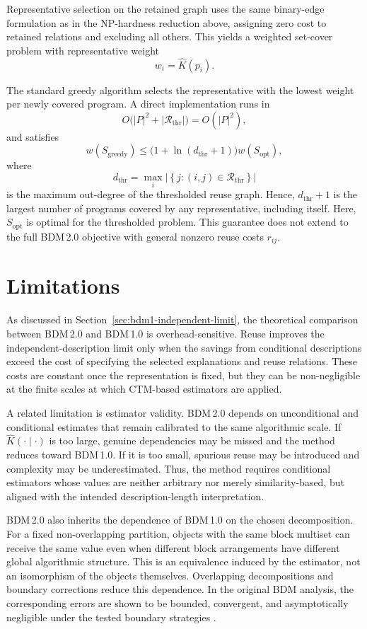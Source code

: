\documentclass{article}
\begin{document}
Representative selection on the retained graph uses the same binary-edge formulation as in the NP-hardness reduction above, assigning zero cost to retained relations and excluding all others. This yields a weighted set-cover problem with representative weight
\[
w_i=\hat K(p_i).
\]

The standard greedy algorithm selects the representative with the lowest weight per newly covered program. A direct implementation runs in
\[
O\bigl(|P|^2+|\mathcal R_{\mathrm{thr}}|\bigr)
=
O(|P|^2),
\]
and satisfies~\cite{chvatal_greedy_1979}
\[
w(S_{\mathrm{greedy}})
\leq
\bigl(1+\ln(d_{\mathrm{thr}}+1)\bigr)
w(S_{\mathrm{opt}}),
\]
where
\[
d_{\mathrm{thr}}
=
\max_i
\left|
\left\{
j:(i,j)\in\mathcal R_{\mathrm{thr}}
\right\}
\right|
\]
is the maximum out-degree of the thresholded reuse graph. Hence, \(d_{\mathrm{thr}}+1\) is the largest number of programs covered by any representative, including itself. Here, \(S_{\mathrm{opt}}\) is optimal for the thresholded problem. This guarantee does not extend to the full BDM\,2.0 objective with general nonzero reuse costs \(r_{ij}\).


\section{Limitations}
\label{sec:limitations}

As discussed in Section~\ref{sec:bdm1-independent-limit}, the theoretical comparison between BDM\,2.0 and BDM\,1.0 is overhead-sensitive. Reuse improves the independent-description limit only when the savings from conditional descriptions exceed the cost of specifying the selected explanations and reuse relations. These costs are constant once the representation is fixed, but they can be non-negligible at the finite scales at which CTM-based estimators are applied.

A related limitation is estimator validity. BDM\,2.0 depends on unconditional and conditional estimates that remain calibrated to the same algorithmic scale. If \(\hat K(\cdot\mid\cdot)\) is too large, genuine dependencies may be missed and the method reduces toward BDM\,1.0. If it is too small, spurious reuse may be introduced and complexity may be underestimated. Thus, the method requires conditional estimators whose values are neither arbitrary nor merely similarity-based, but aligned with the intended description-length interpretation.

BDM\,2.0 also inherits the dependence of BDM\,1.0 on the chosen decomposition. For a fixed non-overlapping partition, objects with the same block multiset can receive the same value even when different block arrangements have different global algorithmic structure. This is an equivalence induced by the estimator, not an isomorphism of the objects themselves. Overlapping decompositions and boundary corrections reduce this dependence. In the original BDM analysis, the corresponding errors are shown to be bounded, convergent, and asymptotically negligible under the tested boundary strategies \cite{zenil_decomposition_2018}.
\end{document}
